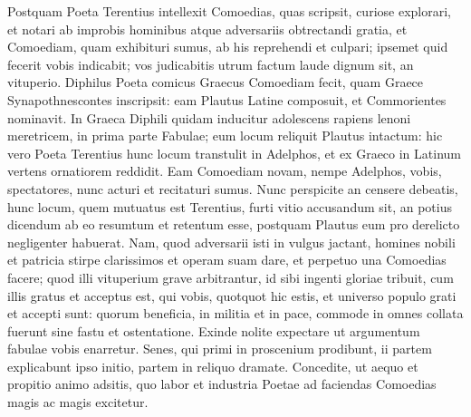 Postquam Poeta Terentius intellexit Comoedias, quas scripsit, curiose explorari, et notari ab improbis hominibus atque adversariis obtrectandi gratia, et Comoediam, quam exhibituri sumus, ab his reprehendi et culpari; ipsemet quid fecerit vobis indicabit; vos judicabitis utrum factum laude dignum sit, an vituperio. Diphilus Poeta comicus Graecus Comoediam fecit, quam Graece Synapothnescontes inscripsit: eam Plautus Latine composuit, et Commorientes nominavit. In Graeca Diphili quidam inducitur adolescens rapiens lenoni meretricem, in prima parte Fabulae; eum locum reliquit Plautus intactum: hic vero Poeta Terentius hunc locum transtulit in Adelphos, et ex Graeco in Latinum vertens ornatiorem reddidit. Eam Comoediam novam, nempe Adelphos, vobis, spectatores, nunc acturi et recitaturi sumus. Nunc perspicite an censere debeatis, hunc locum, quem mutuatus est Terentius, furti vitio accusandum sit, an potius dicendum ab eo resumtum et retentum esse, postquam Plautus eum pro derelicto negligenter habuerat. Nam, quod adversarii isti in vulgus jactant, homines nobili et patricia stirpe clarissimos et operam suam dare, et perpetuo una Comoedias facere; quod illi vituperium grave arbitrantur, id sibi ingenti gloriae tribuit, cum illis gratus et acceptus est, qui vobis, quotquot hic estis, et universo populo grati et accepti sunt: quorum beneficia, in militia et in pace, commode in omnes collata fuerunt sine fastu et ostentatione. Exinde nolite expectare ut argumentum fabulae vobis enarretur. Senes, qui primi in proscenium prodibunt, ii partem explicabunt ipso initio, partem in reliquo dramate. Concedite, ut aequo et propitio animo adsitis, quo labor et industria Poetae ad faciendas Comoedias magis ac magis excitetur.
